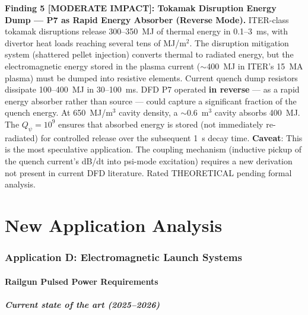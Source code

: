 \documentclass[11pt]{article}
\begin{document}
\begin{tcolorbox}[colback=blue!5!white, colframe=blue!60!black,
  title=\textbf{W4i13 P7 --- Top 5 Findings (Ranked by Impact)}]
\textbf{Finding 5 [MODERATE IMPACT]: Tokamak Disruption Energy Dump --- P7 as Rapid Energy Absorber (Reverse Mode).}
ITER-class tokamak disruptions release 300--350~MJ of thermal energy
in 0.1--3~ms, with divertor heat loads reaching several tens of MJ/m$^2$.
The disruption mitigation system (shattered pellet injection) converts
thermal to radiated energy, but the electromagnetic energy stored in
the plasma current ($\sim$400~MJ in ITER's 15~MA plasma) must be
dumped into resistive elements. Current quench dump resistors dissipate
100--400~MJ in 30--100~ms. DFD P7 operated \textbf{in reverse} ---
as a rapid energy absorber rather than source --- could capture a
significant fraction of the quench energy. At 650~MJ/m$^3$ cavity
density, a $\sim$0.6~m$^3$ cavity absorbs 400~MJ. The $Q_\psi = 10^9$
ensures that absorbed energy is stored (not immediately re-radiated)
for controlled release over the subsequent 1~s decay time.
\textbf{Caveat}: This is the most speculative application. The
coupling mechanism (inductive pickup of the quench current's dB/dt
into psi-mode excitation) requires a new derivation not present in
current DFD literature. Rated THEORETICAL pending formal analysis.

\end{tcolorbox}

\part{New Application Analysis}
\label{part:new-applications}

\section{Application D: Electromagnetic Launch Systems}
\label{sec:EM-launch}

\subsection{Railgun Pulsed Power Requirements}

\subsubsection{Current state of the art (2025--2026)}
\end{document}
